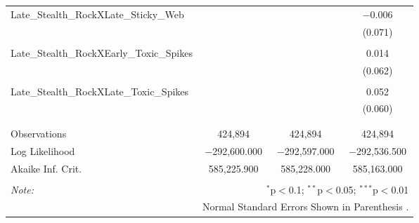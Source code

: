 \documentclass[12pt,twoside]{reedthesis}
\begin{document}
\begin{table}[!htbp]
\begin{tabular}{@{\extracolsep{5pt}}lccc}
   Late\_Stealth\_RockXLate\_Sticky\_Web &  &  & $-$0.006 \\ 
    &  &  & (0.071) \\ 
    & & & \\ 
   Late\_Stealth\_RockXEarly\_Toxic\_Spikes &  &  & 0.014 \\ 
    &  &  & (0.062) \\ 
    & & & \\ 
   Late\_Stealth\_RockXLate\_Toxic\_Spikes &  &  & 0.052 \\ 
    &  &  & (0.060) \\ 
    & & & \\ 
  \hline \\[-1.8ex] 
  Observations & 424,894 & 424,894 & 424,894 \\ 
  Log Likelihood & $-$292,600.000 & $-$292,597.000 & $-$292,536.500 \\ 
  Akaike Inf. Crit. & 585,225.900 & 585,228.000 & 585,163.000 \\ 
  \hline 
  \hline \\[-1.8ex] 
  \textit{Note:}  & \multicolumn{3}{r}{$^{*}$p$<$0.1; $^{**}$p$<$0.05; $^{***}$p$<$0.01} \\ 
   & \multicolumn{3}{r}{Normal Standard Errors Shown in Parenthesis .} \\ 
  \end{tabular} 
  \end{table}
  
\end{document}
